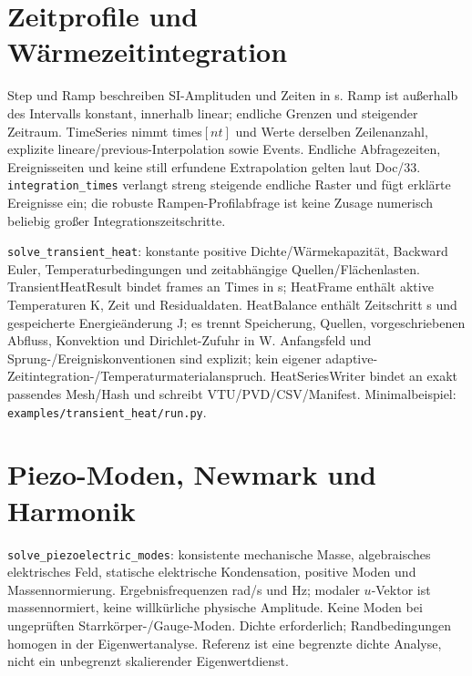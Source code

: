 \section{Zeitprofile und Wärmezeitintegration}
Step und Ramp beschreiben SI-Amplituden und Zeiten in s. Ramp ist außerhalb
des Intervalls konstant, innerhalb linear; endliche Grenzen und steigender
Zeitraum. TimeSeries nimmt times$[nt]$ und Werte derselben Zeilenanzahl,
explizite lineare/previous-Interpolation sowie Events. Endliche Abfragezeiten,
Ereignisseiten und keine still erfundene Extrapolation gelten laut Doc/33.
\texttt{integration\_times} verlangt streng steigende endliche Raster und
fügt erklärte Ereignisse ein; die robuste Rampen-Profilabfrage ist keine
Zusage numerisch beliebig großer Integrationszeitschritte.

\texttt{solve\_transient\_heat}: konstante positive Dichte/Wärmekapazität,
Backward Euler, Temperaturbedingungen und zeitabhängige Quellen/Flächenlasten.
TransientHeatResult bindet frames an Times in s; HeatFrame enthält aktive
Temperaturen K, Zeit und Residualdaten. HeatBalance enthält Zeitschritt s und gespeicherte Energieänderung J; es trennt
Speicherung, Quellen, vorgeschriebenen Abfluss, Konvektion und Dirichlet-Zufuhr
in W. Anfangsfeld und Sprung-/Ereigniskonventionen sind explizit; kein eigener
adaptive-Zeitintegration-/Temperaturmaterialanspruch. HeatSeriesWriter bindet
an exakt passendes Mesh/Hash und schreibt VTU/PVD/CSV/Manifest.
Minimalbeispiel: \nolinkurl{examples/transient_heat/run.py}.

\section{Piezo-Moden, Newmark und Harmonik}
\texttt{solve\_piezoelectric\_modes}: konsistente mechanische Masse,
algebraisches elektrisches Feld, statische elektrische Kondensation,
positive Moden und Massennormierung. Ergebnisfrequenzen rad/s und Hz;
modaler $u$-Vektor ist massennormiert, keine willkürliche physische Amplitude.
Keine Moden bei ungeprüften Starrkörper-/Gauge-Moden. Dichte erforderlich;
Randbedingungen homogen in der Eigenwertanalyse. Referenz ist eine begrenzte
dichte Analyse, nicht ein unbegrenzt skalierender Eigenwertdienst.

